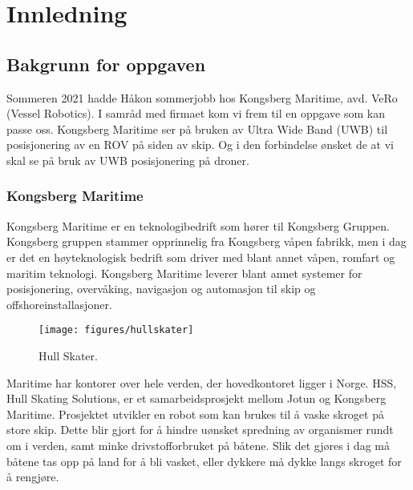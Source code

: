 \section{Innledning}
\subsection{Bakgrunn for oppgaven}
Sommeren 2021 hadde Håkon sommerjobb hos Kongsberg Maritime, avd. VeRo (Vessel Robotics). 
I samråd med firmaet kom vi frem til en oppgave som kan passe oss. Kongsberg Maritime ser 
på bruken av Ultra Wide Band (UWB) til posisjonering av en ROV på siden av skip. Og i den 
forbindelse ønsket de at vi skal se på bruk av UWB posisjonering på droner.

\subsubsection{Kongsberg Maritime}
Kongsberg Maritime er en teknologibedrift som hører til Kongsberg Gruppen. 
Kongsberg gruppen stammer opprinnelig fra Kongsberg våpen fabrikk, 
men i dag er det en høyteknologisk bedrift som driver med blant annet våpen, 
romfart og maritim teknologi. Kongsberg Maritime leverer blant annet systemer 
for posisjonering, overvåking, navigasjon og automasjon til skip og offshoreinstallasjoner.

\begin{figure}[htp]
    \centering
    \texttt{[image: figures/hullskater]}
    \caption{Hull Skater.}
    \label{fig:hullskater}
\end{figure}

Maritime har kontorer over hele verden, der hovedkontoret ligger i Norge.
HSS, Hull Skating Solutions, er et samarbeidsprosjekt mellom Jotun og Kongsberg Maritime. 
Prosjektet utvikler en robot som kan brukes til å vaske skroget på store skip. 
Dette blir gjort for å hindre uønsket spredning av organismer rundt om i verden, 
samt minke drivstofforbruket på båtene. Slik det gjøres i dag må båtene tas opp på land for å bli vasket, 
eller dykkere må dykke langs skroget for å rengjøre. 
\parencite{Keim2015}


